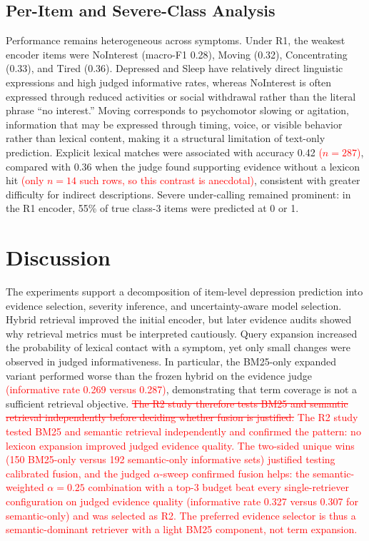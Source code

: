 \documentclass{article}
\DeclareRobustCommand{\rev}[1]{\textcolor{red}{#1}}
\DeclareRobustCommand{\del}[1]{\textcolor{red}{\sout{#1}}}
\begin{document}
\subsection{Per-Item and Severe-Class Analysis}
\label{subsec:item-results}
Performance remains heterogeneous across symptoms. Under R1, the weakest encoder items were NoInterest (macro-F1 0.28), Moving (0.32), Concentrating (0.33), and Tired (0.36). Depressed and Sleep have relatively direct linguistic expressions and high judged informative rates, whereas NoInterest is often expressed through reduced activities or social withdrawal rather than the literal phrase ``no interest.'' Moving corresponds to psychomotor slowing or agitation, information that may be expressed through timing, voice, or visible behavior rather than lexical content, making it a structural limitation of text-only prediction. Explicit lexical matches were associated with accuracy 0.42 \rev{($n=287$)}, compared with 0.36 when the judge found supporting evidence without a lexicon hit \rev{(only $n=14$ such rows, so this contrast is anecdotal)}, consistent with greater difficulty for indirect descriptions. Severe under-calling remained prominent: in the R1 encoder, 55\% of true class-3 items were predicted at 0 or 1.

\section{Discussion}
\label{sec:discussion}
The experiments support a decomposition of item-level depression prediction into evidence selection, severity inference, and uncertainty-aware model selection. Hybrid retrieval improved the initial encoder, but later evidence audits showed why retrieval metrics must be interpreted cautiously. Query expansion increased the probability of lexical contact with a symptom, yet only small changes were observed in judged informativeness. In particular, the BM25-only expanded variant performed worse than the frozen hybrid on the evidence judge \rev{(informative rate 0.269 versus 0.287)}, demonstrating that term coverage is not a sufficient retrieval objective. \del{The R2 study therefore tests BM25 and semantic retrieval independently before deciding whether fusion is justified.} \rev{The R2 study tested BM25 and semantic retrieval independently and confirmed the pattern: no lexicon expansion improved judged evidence quality. The two-sided unique wins (150 BM25-only versus 192 semantic-only informative sets) justified testing calibrated fusion, and the judged $\alpha$-sweep confirmed fusion helps: the semantic-weighted $\alpha=0.25$ combination with a top-3 budget beat every single-retriever configuration on judged evidence quality (informative rate 0.327 versus 0.307 for semantic-only) and was selected as R2. The preferred evidence selector is thus a semantic-dominant retriever with a light BM25 component, not term expansion.}
\end{document}
